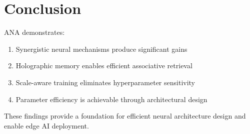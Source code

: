 \documentclass[10pt]{article}
\begin{document}
\section{Conclusion}

ANA demonstrates:
\begin{enumerate}
    \item Synergistic neural mechanisms produce significant gains
    \item Holographic memory enables efficient associative retrieval
    \item Scale-aware training eliminates hyperparameter sensitivity
    \item Parameter efficiency is achievable through architectural design
\end{enumerate}

These findings provide a foundation for efficient neural architecture design and enable edge AI deployment.
\end{document}

